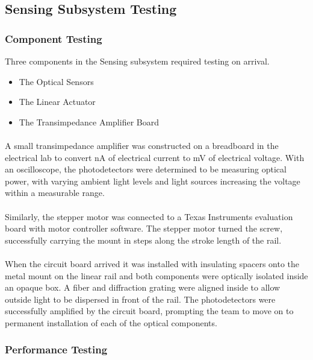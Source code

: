 \subsection{Sensing Subsystem Testing}
\label{sec:sensing_subsystem_testing}

\subsubsection{Component Testing}
Three components in the Sensing subsystem required testing on arrival.
\begin{itemize}
    \item The Optical Sensors
    \item The Linear Actuator
    \item The Transimpedance Amplifier Board
\end{itemize}

\paragraph{} A small transimpedance amplifier was constructed on a breadboard in the electrical lab to convert nA of electrical current to mV of electrical voltage. With an oscilloscope, the photodetectors were determined to be measuring optical power, with varying ambient light levels and light sources increasing the voltage within a measurable range.

\paragraph{} Similarly, the stepper motor was connected to a Texas Instruments evaluation board with motor controller software. The stepper motor turned the screw, successfully carrying the mount in steps along the stroke length of the rail.

\paragraph{} When the circuit board arrived it was installed with insulating spacers onto the metal mount on the linear rail and both components were optically isolated inside an opaque box. A fiber and diffraction grating were aligned inside to allow outside light to be dispersed in front of the rail. The photodetectors were successfully amplified by the circuit board, prompting the team to move on to permanent installation of each of the optical components.

\subsubsection{Performance Testing}

